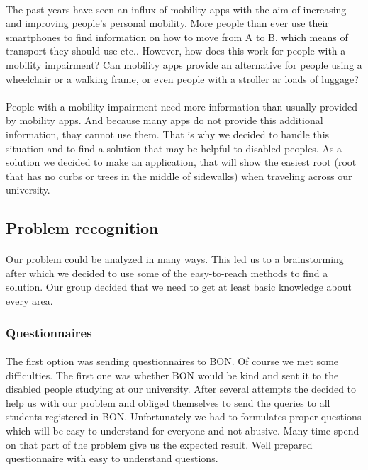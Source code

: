 \documentclass[12pt]{article}
\begin{document}
\paragraph{}The past years have seen an influx of mobility apps with the aim of increasing and improving people's personal mobility. More people than ever use their smartphones to find information on how to move from A to B, which means of transport they should use etc.. However, how does this work for people with a mobility impairment? Can mobility apps provide an alternative for people using a wheelchair or a walking frame, or even people with a stroller ar loads of luggage?\\\\
People with a mobility impairment need more information than usually provided by mobility apps. And because many apps do not provide this additional information, thay cannot use them. That is why we decided to handle this situation and to find a solution that may be helpful to disabled peoples.
As a solution we decided to make an application, that will show the easiest root (root that has no curbs or trees in the middle of sidewalks) when traveling across our university. 



\subsection{Problem recognition}
\paragraph{}Our problem could be analyzed in many ways. This led us to a brainstorming after which we decided to use some of the easy-to-reach methods to find a solution. Our group decided that we need to get at least basic knowledge about every area. 
\subsubsection{Questionnaires}
\paragraph{}The first option was sending questionnaires to BON. Of course we met some difficulties. The first one was whether BON would be kind and sent it to the disabled people studying at our university. After several attempts the decided to help us with our problem and obliged themselves to send the queries to all students registered in BON. Unfortunately we had to formulates proper questions which will be easy to understand for everyone and not abusive. Many time spend on that part of the problem give us the expected result. Well prepared questionnaire with easy to understand questions. 
\end{document}
